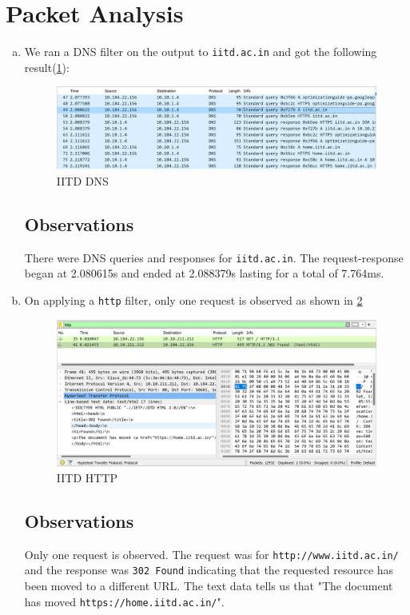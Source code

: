 \documentclass{article}
\begin{document}
\section{Packet Analysis}
\begin{enumerate}[a.]
    \item We ran a DNS filter on the output to {\tt iitd.ac.in} and got the following result(\cref{fig:IITDDNS}):
    \begin{figure}[!ht]
        \centering
        \includegraphics[scale=0.5]{images/IITD dns.png}
        \caption{IITD DNS}
        \label{fig:IITDDNS}
    \end{figure}
    \subsection*{Observations}
    There were DNS queries and responses for {\tt iitd.ac.in}. The request-response began at 2.080615s and ended at 2.088379s lasting for a total of 7.764ms.
    \item On applying a {\tt http} filter, only one request is observed as shown in \cref{fig:IITDHTTP}
    \begin{figure}[!ht]
        \centering
        \includegraphics[scale=0.5]{images/IITD http.png}
        \caption{IITD HTTP}
        \label{fig:IITDHTTP}
    \end{figure}
    \subsection*{Observations}
    Only one request is observed. The request was for {\tt http://www.iitd.ac.in/} and the response was {\tt 302 Found} indicating that the requested resource has been moved to a different URL. The text data tells us that "The document has moved {\tt https://home.iitd.ac.in/}".


\end{enumerate}
\end{document}
